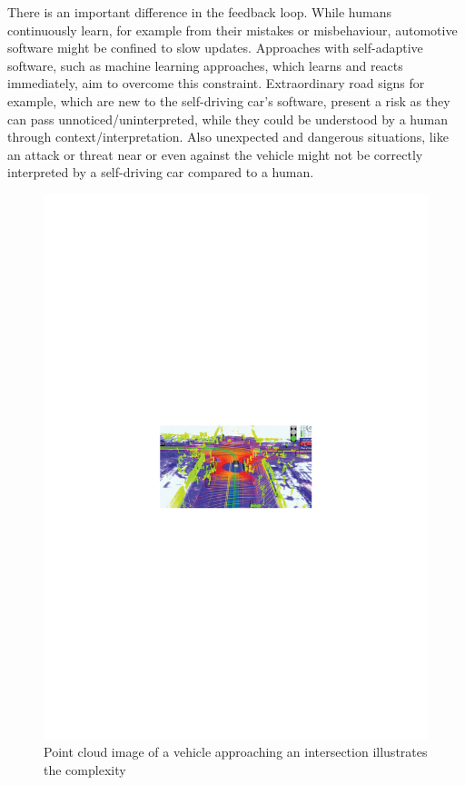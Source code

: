 
There is an important difference in the feedback loop. While humans continuously learn, for example from their mistakes or misbehaviour, automotive software might be confined to slow updates. Approaches with self-adaptive software, such as machine learning approaches, which learns and reacts immediately, aim to overcome this constraint. Extraordinary road signs for example, which are new to the self-driving car's software, present a risk as they can pass unnoticed/uninterpreted, while they could be understood by a human through context/interpretation. Also unexpected and dangerous situations, like an attack or threat near or even against the vehicle might not be correctly interpreted by a self-driving car compared to a human. 

\begin{figure}
\centering
\includegraphics[width=1\linewidth]{Figures/pointCloud.pdf}
\caption{Point cloud image of a vehicle approaching an intersection illustrates the complexity \cite{EarthImagingJournalEIJ:RemoteSensingSatelliteImages2012}}
\label{fig:PointCloudImageGoogle}
\end{figure}

